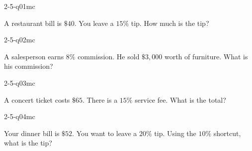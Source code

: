 

\begin{practiceQuestion}{2-5-q01}{mc}
\begin{questionText}
A restaurant bill is $\$40$. You leave a $15\%$ tip. How much is the tip?
\end{questionText}
\end{practiceQuestion}

\begin{practiceQuestion}{2-5-q02}{mc}
\begin{questionText}
A salesperson earns $8\%$ commission. He sold $\$3{,}000$ worth of furniture. What is his commission?
\end{questionText}
\end{practiceQuestion}

\begin{practiceQuestion}{2-5-q03}{mc}
\begin{questionText}
A concert ticket costs $\$65$. There is a $15\%$ service fee. What is the total?
\end{questionText}
\end{practiceQuestion}

\begin{practiceQuestion}{2-5-q04}{mc}
\begin{questionText}
Your dinner bill is $\$52$. You want to leave a $20\%$ tip. Using the $10\%$ shortcut, what is the tip?
\end{questionText}
\end{practiceQuestion}

